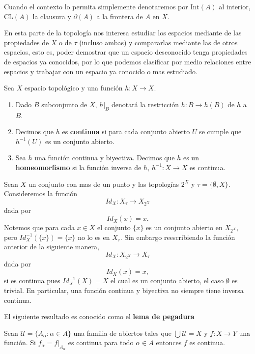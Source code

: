 \begin{cn}
Cuando el contexto lo permita simplemente denotaremos por $\mathrm{Int}(A)$ al interior, $\mathrm{CL}(A)$ la clausura y  $\partial(A)$ a la frontera de $A$ en $X$.
\end{cn}


En esta parte de la topología nos interesa estudiar los espacios mediante de las propiedades de $X$ o de $\tau$ (incluso ambas) y compararlas mediante las de otros espacios, esto es, poder demostrar que un espacio desconocido tenga propiedades de espacios ya conocidos, por lo que podemos clasificar por medio relaciones entre espacios y trabajar con un espacio ya conocido o mas estudiado.

\begin{df}
Sea $X$ espacio topológico y una función $h:X \to X$. 
\begin{enumerate}

	\item Dado $B$ subconjunto de $X$, $h|_B$ denotará la restricción $h:B \to h(B)$ de $h$ a $B$. 
	
	\item  Decimos que $h$ es \textbf{continua} si para cada conjunto abierto $U$ se cumple que $h^{-1}(U)$ es un conjunto abierto.
	
	\item  Sea $h$ una función continua y biyectiva. Decimos que $h$ es un \textbf{homeomorfismo} si la función inversa de $h$, $h^{-1}:X \to X$ es continua. 	
\end{enumerate}
\end{df}


\begin{ej}
Sean $X$ un conjunto con mas de un punto y las topologías $2^X$ y $\tau=\{\emptyset, X\}$. Consideremos la función $$Id_X:X_{\tau} \to X_{2^X}$$ dada por $$Id_X(x)=x.$$
Notemos que para cada $x \in X$ el conjunto $\{x\}$ es un conjunto abierto en $X_{2^X}$, pero $Id_X^{-1}(\{x\})= \{x\}$ no lo es en $X_\tau$. Sin embargo reescribiendo  la función anterior de la siguiente manera,  $$Id_X:X_{2^X} \to X_{\tau}$$ dada por $$Id_X(x)=x,$$
si es continua pues $Id_X^{-1}(X)=X$ el cual es un conjunto abierto, el caso $\emptyset$ es trivial. En particular, una función continua y biyectiva no siempre tiene inversa continua. 
\end{ej}

El siguiente resultado es conocido como el \textbf{lema de pegadura}

\begin{pr}
Sean $\mathcal{U}= \{A_\alpha :\alpha \in A\}$ una familia de abiertos tales que $\bigcup \mathcal{U} = X$ y $f:X \to Y$ una función. Si $f_\alpha=f|_{A_\alpha}$ es continua para todo $\alpha \in A$ entonces $f$ es continua.  
\end{pr}

